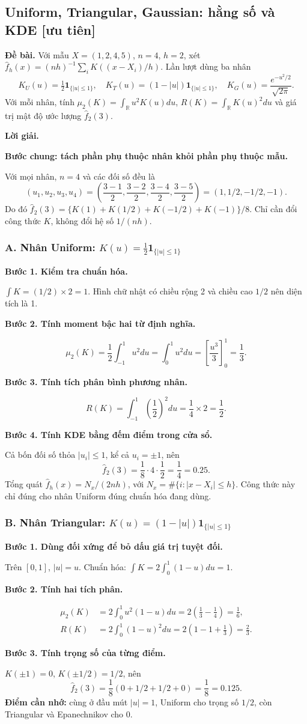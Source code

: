 \documentclass[11pt,a4paper]{article}
\newcommand{\R}{\mathbb R}
\newcommand{\buoc}[1]{\par\medskip\textbf{#1}\par}
\begin{document}
\subsection{Uniform, Triangular, Gaussian: hằng số và KDE [ưu tiên]}\label{sec:kernels}
\textbf{Đề bài.} Với mẫu $X=(1,2,4,5)$, $n=4$, $h=2$, xét
$\widehat f_h(x)=(nh)^{-1}\sum_iK((x-X_i)/h)$.
Lần lượt dùng ba nhân
\[
K_U(u)=\tfrac12\mathbf1_{\{|u|\leq1\}},\quad
K_T(u)=(1-|u|)\mathbf1_{\{|u|\leq1\}},\quad
K_G(u)=\frac{e^{-u^2/2}}{\sqrt{2\pi}}.
\]
Với mỗi nhân, tính $\mu_2(K)=\int_{\R}u^2K(u)du$, $R(K)=\int_{\R}K(u)^2du$
và giá trị mật độ ước lượng $\widehat f_2(3)$.

\textbf{Lời giải.}

\buoc{Bước chung: tách phần phụ thuộc nhân khỏi phần phụ thuộc mẫu.}
Với mọi nhân, $n=4$ và các đối số đều là
\[
(u_1,u_2,u_3,u_4)=\left(\frac{3-1}{2},\frac{3-2}{2},\frac{3-4}{2},\frac{3-5}{2}\right)
=(1,1/2,-1/2,-1).
\]
Do đó $\widehat f_2(3)=\{K(1)+K(1/2)+K(-1/2)+K(-1)\}/8$. Chỉ cần đổi công thức $K$, không đổi hệ số $1/(nh)$.

\subsubsection*{A. Nhân Uniform: $K(u)=\tfrac12\mathbf1_{\{|u|\leq1\}}$}
\buoc{Bước 1. Kiểm tra chuẩn hóa.}
$\int K=(1/2)\times2=1$. Hình chữ nhật có chiều rộng 2 và chiều cao $1/2$ nên diện tích là 1.
\buoc{Bước 2. Tính moment bậc hai từ định nghĩa.}
\[
\mu_2(K)=\frac12\int_{-1}^1u^2du
=\int_0^1u^2du=\left[\frac{u^3}{3}\right]_0^1=\boxed{\frac13}.
\]
\buoc{Bước 3. Tính tích phân bình phương nhân.}
\[
R(K)=\int_{-1}^1\left(\frac12\right)^2du=\frac14\times2=\boxed{\frac12}.
\]
\buoc{Bước 4. Tính KDE bằng đếm điểm trong cửa sổ.}
Cả bốn đối số thỏa $|u_i|\leq1$, kể cả $u_i=\pm1$, nên
\[
\boxed{\widehat f_2(3)=\frac18\cdot4\cdot\frac12=\frac14=0.25.}
\]
Tổng quát $\widehat f_h(x)=N_x/(2nh)$, với $N_x=\#\{i:|x-X_i|\leq h\}$. Công thức này chỉ đúng cho nhân Uniform đúng chuẩn hóa đang dùng.

\subsubsection*{B. Nhân Triangular: $K(u)=(1-|u|)\mathbf1_{\{|u|\leq1\}}$}
\buoc{Bước 1. Dùng đối xứng để bỏ dấu giá trị tuyệt đối.}
Trên $[0,1]$, $|u|=u$. Chuẩn hóa: $\int K=2\int_0^1(1-u)du=1$.
\buoc{Bước 2. Tính hai tích phân.}
\begin{align*}
\mu_2(K)&=2\int_0^1u^2(1-u)du
=2\left(\frac13-\frac14\right)=\boxed{\frac16},\\
R(K)&=2\int_0^1(1-u)^2du
=2\left(1-1+\frac13\right)=\boxed{\frac23}.
\end{align*}
\buoc{Bước 3. Tính trọng số của từng điểm.}
$K(\pm1)=0$, $K(\pm1/2)=1/2$, nên
\[
\boxed{\widehat f_2(3)=\frac18(0+1/2+1/2+0)=\frac18=0.125.}
\]
\textbf{Điểm cần nhớ:} cùng ở đầu mút $|u|=1$, Uniform cho trọng số $1/2$, còn Triangular và Epanechnikov cho 0.
\end{document}
